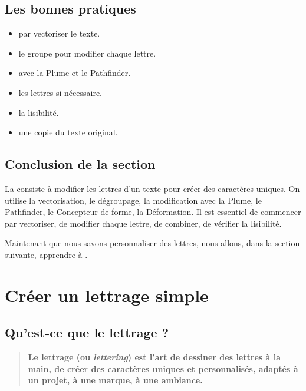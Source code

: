 \subsection{Les bonnes pratiques}

\begin{itemize}
    \item {} par vectoriser le texte.
    \item {} le groupe pour modifier chaque lettre.
    \item {} avec la Plume et le Pathfinder.
    \item {} les lettres si nécessaire.
    \item {} la lisibilité.
    \item {} une copie du texte original.
\end{itemize}

\subsection*{Conclusion de la section}

La  consiste à modifier les lettres d'un texte pour créer des caractères uniques. On utilise la vectorisation, le dégroupage, la modification avec la Plume, le Pathfinder, le Concepteur de forme, la Déformation. Il est essentiel de commencer par vectoriser, de modifier chaque lettre, de combiner, de vérifier la lisibilité.

Maintenant que nous savons personnaliser des lettres, nous allons, dans la section suivante, apprendre à .

\section{Créer un lettrage simple}

\subsection{Qu'est-ce que le lettrage ?}

\begin{quote}
\textbf{Le lettrage (ou \emph{lettering}) est l'art de dessiner des lettres à la main, de créer des caractères uniques et personnalisés, adaptés à un projet, à une marque, à une ambiance.}
\end{quote}

